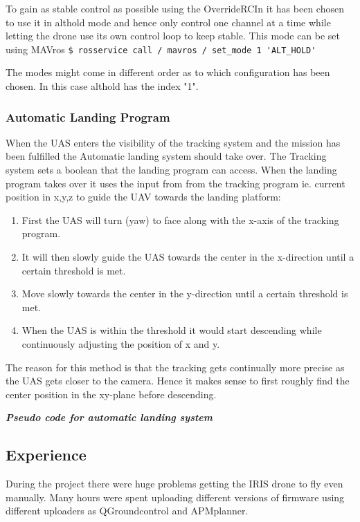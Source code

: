 To gain as stable control as possible using the OverrideRCIn it has been chosen to use it in althold mode and hence only control one channel at a time while letting the drone use its own control loop to keep stable. This mode can be set using MAVros
\verb|$ rosservice call / mavros / set_mode 1 'ALT_HOLD'|

The modes might come in different order as to which configuration has been chosen. In this case althold has the index "1".
\subsubsection{Automatic Landing Program}

When the UAS enters the visibility of the tracking system and the mission has been fulfilled the Automatic landing system should take over.
The Tracking system sets a boolean that the landing program can access. When the landing program takes over it uses the input from from the tracking program ie. current position in x,y,z to guide the UAV towards the landing platform:

\begin{enumerate}
\item First the UAS will turn (yaw) to face along with the x-axis of the tracking program.
\item It will then slowly guide the UAS towards the center in the x-direction until a certain threshold is met.
\item Move slowly towards the center in the y-direction until a certain threshold is met.
\item When the UAS is within the threshold it would start descending while continuously adjusting the position of x and y.
\end{enumerate}
The reason for this method is that the tracking gets continually more precise as the UAS gets closer to the camera. Hence it makes sense to first roughly find the center position in the xy-plane before descending. 

\emph{\textbf{Pseudo code for automatic landing system}}
\lstset{tabsize=4}


\subsection{Experience}
During the project there were huge problems getting the IRIS drone to fly even manually. Many hours were spent uploading different versions of firmware using different uploaders as QGroundcontrol and APMplanner. 

